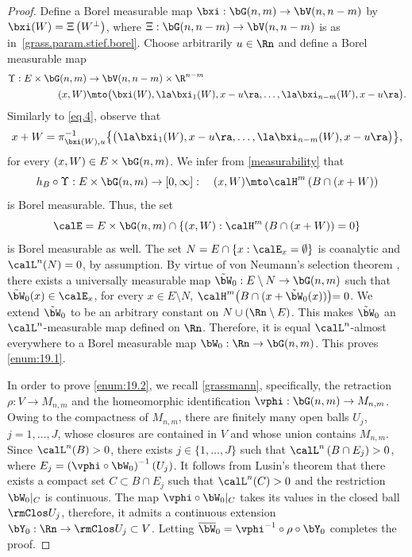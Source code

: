 \begin{proof}
Define a Borel measurable map $\bxi: \bG(n,m) \to \bV(n,n-m)$ by $\bxi(W) = \Xi \left(W^\perp \right)$, where $\Xi: \bG(n,n-m) \to \bV(n,n-m)$ is as in~\ref{grass.param.stief.borel}.
Choose arbitrarily $u \in \Rn$ and define a Borel measurable map
\begin{align*}
\Upsilon: E \times \bG(n,m) &\to \bV(n,n-m) \times \R^{n-m} \\
(x,W) &\mto \bigl(\bxi(W), \la \bxi_1(W),x-u \ra, \ldots, \la \bxi_{n-m}(W),x-u \ra \bigr).
\end{align*}
Similarly to \eqref{eq.4}, observe that
\begin{equation*}
x+W = \pi_{\bxi(W),u}^{-1} \bigl\{ \bigl(\la \bxi_1(W),x-u \ra, \ldots, \la \bxi_{n-m}(W),x-u \ra \bigr) \bigr\},
\end{equation*}
for every $(x,W) \in E \times \bG(n,m)$.
We infer from \ref{measurability} that
\begin{equation*}
h_{B} \circ \Upsilon:E \times \bG(n,m) \to [0,\infty]:\quad(x,W) \mto \calH^m \left(B \cap (x+W) \right)
\end{equation*}
is Borel measurable.
Thus, the set
\begin{equation*}
\calE = E \times \bG(n,m) \cap \left\{ (x,W): \calH^m \left(B \cap (x+W) \right) = 0 \right\}
\end{equation*}
is Borel measurable as well.
The set $N = E \cap \{ x: \calE_x = \emptyset \}$ is coanalytic and $\calL^n(N)=0$, by assumption.
By virtue of von Neumann's selection theorem \cite[5.5.3]{SRIVASTAVA}, there exists a universally measurable map $\tilde{\bW}_0: E \setminus N \to \bG(n,m)$ such that $\tilde{\bW}_0(x) \in \calE_x$, for every $x \in E \setminus N$, \ie $\calH^m \bigl(B \cap(x + \tilde{\bW}_0(x))\bigl) = 0$.
We extend $\tilde{\bW}_0$ to be an arbitrary constant on $N \cup (\Rn \setminus E)$.
This makes $\tilde{\bW}_0$ an $\calL^n$-measurable map defined on $\Rn$.
Therefore, it is equal $\calL^n$-almost everywhere to a Borel measurable map $\bW_0: \Rn \to \bG(n,m)$.
This proves \eqref{enum:19.1}.
\par
In order to prove \eqref{enum:19.2}, we recall \ref{grassmann}, specifically, the retraction $\rho: V \to M_{n,m}$ and the homeomorphic identification $\vphi: \bG(n,m) \to M_{n,m}$.
Owing to the compactness of $M_{n,m}$, there are finitely many open balls $U_j$, $j=1,\ldots,J$, whose closures are contained in $V$ and whose union contains $M_{n,m}$.
Since $\calL^n(B) > 0$, there exists $j \in \{1,\ldots,J\}$ such that $\calL^n \left(B \cap E_j \right) > 0$, where $E_j = \left(\vphi \circ \bW_0 \right)^{-1}(U_j)$.
It follows from Lusin's theorem \cite[2.5.3]{GMT} that there exists a compact set $C \subset B \cap E_j$ such that $\calL^n(C) > 0$ and the restriction $\bW_0|_C$ is continuous.
The map $\vphi \circ \bW_0|_C$ takes its values in the closed ball $\rmClos U_j$, therefore, it admits a continuous extension $\bY_0: \Rn \to \rmClos U_j \subset V$.
Letting $\overline{\bW}_0 = \vphi^{-1} \circ \rho \circ \bY_0$ completes the proof.
\end{proof}

